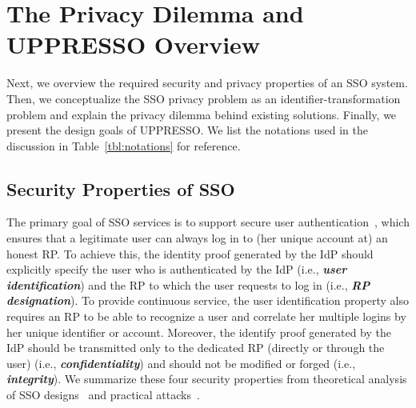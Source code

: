 \section{The Privacy Dilemma and UPPRESSO Overview}
\label{sec:challenge}
Next, we overview the required security and privacy properties of an SSO system. Then, we conceptualize the SSO privacy problem as an identifier-transformation problem and explain the privacy dilemma behind existing solutions. Finally, we present the design goals of UPPRESSO. %
We list the notations used in the discussion in Table~\ref{tbl:notations} for reference.

\subsection{Security Properties of SSO}
\label{subsec:basicrequirements}
The primary goal of SSO services is to support secure user authentication~\cite{SPRESSO}, which ensures that a legitimate user can always log in to (her unique account at) an honest RP. To achieve this, the identity proof generated by the IdP should explicitly specify the user who is authenticated by the IdP (i.e., \textbf{\textit{user identification}}) and the RP to which the user requests to log in (i.e., \textbf{\textit{RP designation}}). To provide continuous service, the user identification property also requires an RP to be able to recognize a user and correlate her multiple logins by her unique identifier or account. Moreover, the identify proof generated by the IdP should be transmitted only to the dedicated RP (directly or through the user) (i.e., \textbf{\textit{confidentiality}}) and should not be modified or forged (i.e., \textbf{\textit{integrity}}). We summarize these four security properties from theoretical analysis of SSO designs~\cite{ArmandoCCCT08,FettKS16, FettKS17} and practical attacks~\cite{SomorovskyMSKJ12, WangCW12, ArmandoCCCPS13, ZhouE14, WangZLLYLG15, WangZLG16, YangLLZH16, MainkaMS16, MainkaMSW17, YangLCZ18, YangLS17, ShiWL19, ChenPCTKT14, ccsSunB12, DiscoveringJCS, dimvaLiM16, CaoSBKVC14, TowardsShehabM14}.

